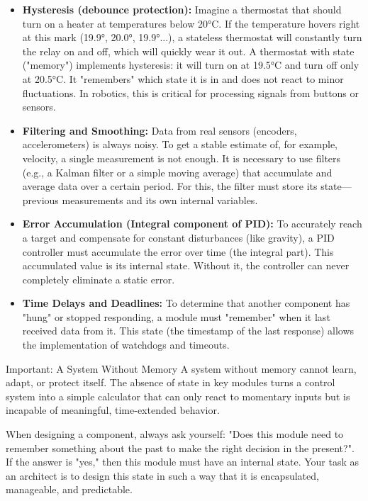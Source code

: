 \begin{itemize}
    \item \textbf{Hysteresis (debounce protection):} Imagine a thermostat that should turn on a heater at temperatures below 20°C. If the temperature hovers right at this mark (19.9°, 20.0°, 19.9°...), a stateless thermostat will constantly turn the relay on and off, which will quickly wear it out. A thermostat with state ("memory") implements hysteresis: it will turn on at 19.5°C and turn off only at 20.5°C. It "remembers" which state it is in and does not react to minor fluctuations. In robotics, this is critical for processing signals from buttons or sensors.
    \item \textbf{Filtering and Smoothing:} Data from real sensors (encoders, accelerometers) is always noisy. To get a stable estimate of, for example, velocity, a single measurement is not enough. It is necessary to use filters (e.g., a Kalman filter or a simple moving average) that accumulate and average data over a certain period. For this, the filter must store its state—previous measurements and its own internal variables.
    \item \textbf{Error Accumulation (Integral component of PID):} To accurately reach a target and compensate for constant disturbances (like gravity), a PID controller must accumulate the error over time (the integral part). This accumulated value is its internal state. Without it, the controller can never completely eliminate a static error.
    \item \textbf{Time Delays and Deadlines:} To determine that another component has "hung" or stopped responding, a module must "remember" when it last received data from it. This state (the timestamp of the last response) allows the implementation of watchdogs and timeouts.
\end{itemize}

\begin{principlebox}{Important: A System Without Memory}
A system without memory cannot learn, adapt, or protect itself. The absence of state in key modules turns a control system into a simple calculator that can only react to momentary inputs but is incapable of meaningful, time-extended behavior.
\end{principlebox}

When designing a component, always ask yourself: "Does this module need to remember something about the past to make the right decision in the present?". If the answer is "yes," then this module must have an internal state. Your task as an architect is to design this state in such a way that it is encapsulated, manageable, and predictable.


